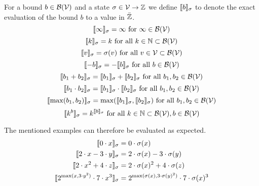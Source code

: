 \begin{definition}
  For a bound $b \in \mathcal{B}(\mathcal{V})$ and a state $\sigma \in \mathcal{V} \rightarrow \mathbb{Z}$ we define $\llbracket b \rrbracket_{\sigma}$ to denote the exact evaluation of the bound $b$ to a value in $\bar{\mathbb{Z}}$.
  \[ \llbracket \infty \rrbracket_{\sigma} = \infty \text{ for } \infty \in \mathcal{B}(\mathcal{V}) \]
  \[ \llbracket k \rrbracket_{\sigma} = k \text{ for all } k \in \mathbb{N} \subset \mathcal{B}(\mathcal{V}) \] 
  \[ \llbracket v \rrbracket_{\sigma} = \sigma(v) \text{ for all } v \in \mathcal{V} \subset \mathcal{B}(\mathcal{V}) \] 
  \[ \llbracket -b \rrbracket_{\sigma} = -\llbracket b \rrbracket_{\sigma} \text{ for all } b \in \mathcal{B}(\mathcal{V}) \] 
  \[ \llbracket b_1 + b_2 \rrbracket_{\sigma} = \llbracket b_1 \rrbracket_{\sigma} + \llbracket b_2 \rrbracket_{\sigma} \text{ for all } b_1, b_2 \in \mathcal{B}(\mathcal{V}) \] 
  \[ \llbracket b_1 \cdot b_2 \rrbracket_{\sigma} = \llbracket b_1 \rrbracket_{\sigma} \cdot \llbracket b_2 \rrbracket_{\sigma} \text{ for all } b_1, b_2 \in \mathcal{B}(\mathcal{V}) \] 
  \[ \llbracket \max(b_1, b_2) \rrbracket_{\sigma} = \max(\llbracket b_1 \rrbracket_{\sigma}, \llbracket b_2 \rrbracket_{\sigma}) \text{ for all } b_1, b_2 \in \mathcal{B}(\mathcal{V}) \]
  \[ \llbracket k^b \rrbracket_{\sigma} = k^{\llbracket b \rrbracket_{\sigma}} \text{ for all } k \in \mathbb{N} \subset \mathcal{B}(\mathcal{V}), b \in \mathcal{B}(\mathcal{V}) \]  
\end{definition}
The mentioned examples can therefore be evaluated as expected.
\begin{align*}
  \llbracket 0 \cdot x \rrbracket_{\sigma} &= 0 \cdot \sigma(x) \\
  \llbracket 2 \cdot x - 3 \cdot y \rrbracket_{\sigma} &= 2 \cdot \sigma(x) - 3 \cdot \sigma(y) \\
  \llbracket 2 \cdot x^2 + 4 \cdot z \rrbracket_{\sigma} &= 2 \cdot \sigma(x)^2 + 4 \cdot \sigma(z) \\
  \llbracket 2^{\max(x,3 \cdot y^2)} \cdot 7 \cdot x^3 \rrbracket_{\sigma} &= 2^{\max(\sigma(x),3 \cdot \sigma(y)^2)} \cdot 7 \cdot \sigma(x)^3
\end{align*}

